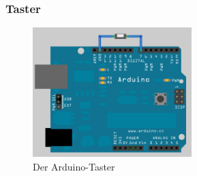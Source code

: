 \documentclass[a4paper,12pt,headsepline]{scrartcl}
\begin{document}
			
	\subsubsection{Taster}
\begin{figure} [H]
\centering
\includegraphics[height=5cm]{Images/button_hardware.png}
\caption{Der Arduino-Taster}
\label{fig:arduinotaster}
\end{figure}
	
\end{document}
